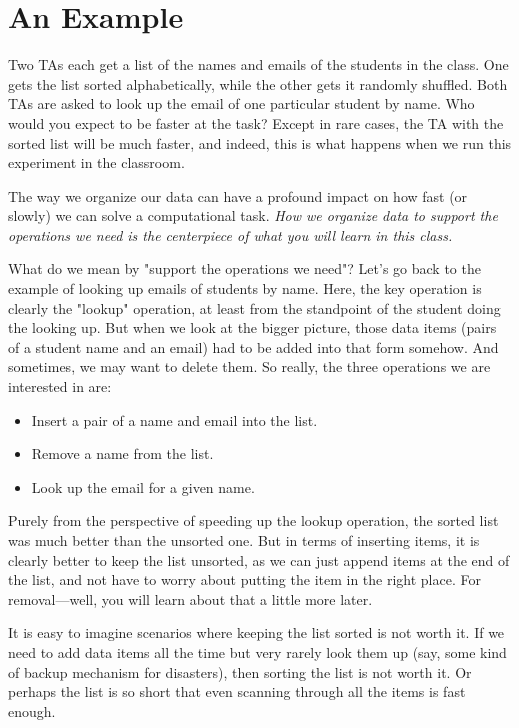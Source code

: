 \section{An Example}

\begin{displayquote}
Two TAs each get a list of the names and emails of the students in the class.
One gets the list sorted alphabetically, while the other gets it randomly shuffled.
Both TAs are asked to look up the email of one particular student by name.
Who would you expect to be faster at the task?
Except in rare cases, the TA with the sorted list will be much faster, and indeed, this is what happens when we run this experiment in the classroom. 
\end{displayquote}

The way we organize our data can have a profound impact on how fast (or slowly) we can solve a computational task. 
\emph{How we organize data to support the operations we need is the centerpiece of what you will learn in this class.}

What do we mean by "support the operations we need"?
Let's go back to the example of looking up emails of students by name.
Here, the key operation is clearly the "lookup" operation, at least from the standpoint of the student doing the looking up.
But when we look at the bigger picture, those data items (pairs of a student name and an email) had to be added into that form somehow.
And sometimes, we may want to delete them.
So really, the three operations we are interested in are:

\begin{itemize}
\item Insert a pair of a name and email into the list.
\item Remove a name from the list.
\item Look up the email for a given name.
\end{itemize}

Purely from the perspective of speeding up the lookup operation, the sorted list was much better than the unsorted one.
But in terms of inserting items, it is clearly better to keep the list unsorted, as we can just append items at the end of the list, and not have to worry about putting the item in the right place.
For removal---well, you will learn about that a little more later.

It is easy to imagine scenarios where keeping the list sorted is not worth it.
If we need to add data items all the time but very rarely look them up (say, some kind of backup mechanism for disasters), then sorting the list is not worth it.
Or perhaps the list is so short that even scanning through all the items is fast enough.

